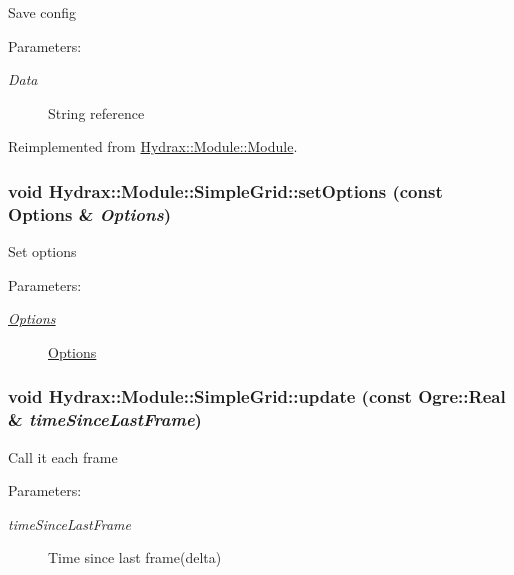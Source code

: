 Save config \begin{Desc}
\item[Parameters:]
\begin{description}
\item[{\em Data}]String reference \end{description}
\end{Desc}


Reimplemented from \hyperlink{class_hydrax_1_1_module_1_1_module_998a5baf42f57b02ca7bc20bc12f95a9}{Hydrax::Module::Module}.\hypertarget{class_hydrax_1_1_module_1_1_simple_grid_6b83cb95b2803b068a53bf76afaa9ac4}{
\subsubsection[{setOptions}]{\setlength{\rightskip}{0pt plus 5cm}void Hydrax::Module::SimpleGrid::setOptions (const {\bf Options} \& {\em Options})}}
\label{class_hydrax_1_1_module_1_1_simple_grid_6b83cb95b2803b068a53bf76afaa9ac4}


Set options \begin{Desc}
\item[Parameters:]
\begin{description}
\item[{\em \hyperlink{struct_hydrax_1_1_module_1_1_simple_grid_1_1_options}{Options}}]\hyperlink{struct_hydrax_1_1_module_1_1_simple_grid_1_1_options}{Options} \end{description}
\end{Desc}
\hypertarget{class_hydrax_1_1_module_1_1_simple_grid_aa120d4f487785136a3134cc8980fb16}{
\subsubsection[{update}]{\setlength{\rightskip}{0pt plus 5cm}void Hydrax::Module::SimpleGrid::update (const Ogre::Real \& {\em timeSinceLastFrame})}}
\label{class_hydrax_1_1_module_1_1_simple_grid_aa120d4f487785136a3134cc8980fb16}


Call it each frame \begin{Desc}
\item[Parameters:]
\begin{description}
\item[{\em timeSinceLastFrame}]Time since last frame(delta) \end{description}
\end{Desc}


